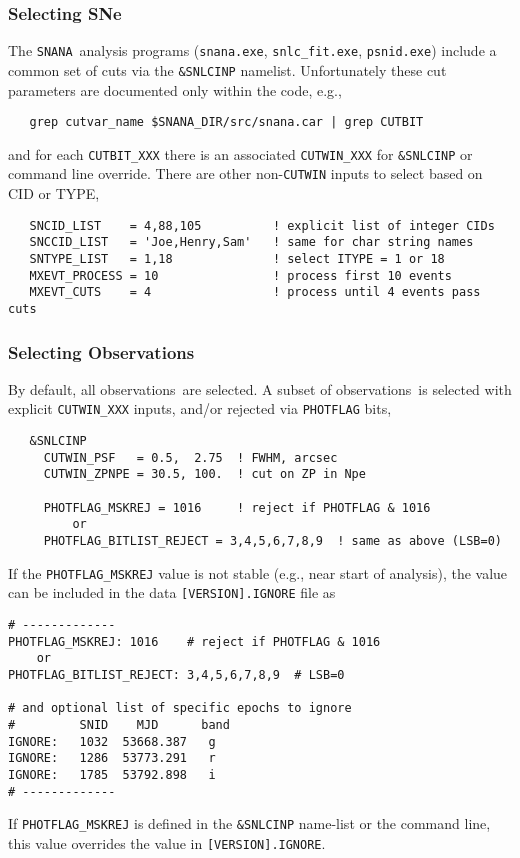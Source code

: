 \documentclass[12pt]{article}
\newcommand{\snana}{{\tt SNANA}}
\newcommand{\obss}{observations}
\begin{document}
  \clearpage
  \subsubsection{Selecting SNe}
  \label{sss:select_SN}

The \snana\ analysis programs 
({\tt snana.exe}, {\tt snlc\_fit.exe}, {\tt psnid.exe})
include a common set of cuts via the {\tt \&SNLCINP} namelist.
Unfortunately these cut parameters are documented only within
the code, e.g.,
\begin{verbatim}                                                               
   grep cutvar_name $SNANA_DIR/src/snana.car | grep CUTBIT
\end{verbatim}
and for each {\tt CUTBIT\_XXX} there is an associated 
{\tt CUTWIN\_XXX} for {\tt \&SNLCINP} or command line override.
There are other non-{\tt CUTWIN} inputs to select based on CID or TYPE,
\begin{verbatim}
   SNCID_LIST    = 4,88,105          ! explicit list of integer CIDs
   SNCCID_LIST   = 'Joe,Henry,Sam'   ! same for char string names
   SNTYPE_LIST   = 1,18              ! select ITYPE = 1 or 18
   MXEVT_PROCESS = 10                ! process first 10 events
   MXEVT_CUTS    = 4                 ! process until 4 events pass cuts
\end{verbatim}


  \subsubsection{Selecting Observations}
  \label{sss:select_obs}

By default, all \obss\ are selected.
A subset of \obss\ is selected with explicit {\tt CUTWIN\_XXX} inputs,
and/or rejected via {\tt PHOTFLAG} bits,
\begin{verbatim} 
   &SNLCINP
     CUTWIN_PSF   = 0.5,  2.75  ! FWHM, arcsec
     CUTWIN_ZPNPE = 30.5, 100.  ! cut on ZP in Npe

     PHOTFLAG_MSKREJ = 1016     ! reject if PHOTFLAG & 1016
         or
     PHOTFLAG_BITLIST_REJECT = 3,4,5,6,7,8,9  ! same as above (LSB=0)
\end{verbatim}
%
If the {\tt PHOTFLAG\_MSKREJ} value is not stable 
(e.g., near start of analysis), the value can be included
in the data {\tt [VERSION].IGNORE} file as
%
\begin{verbatim}
# -------------
PHOTFLAG_MSKREJ: 1016    # reject if PHOTFLAG & 1016
    or
PHOTFLAG_BITLIST_REJECT: 3,4,5,6,7,8,9  # LSB=0

# and optional list of specific epochs to ignore
#         SNID    MJD      band
IGNORE:   1032  53668.387   g 
IGNORE:   1286  53773.291   r
IGNORE:   1785  53792.898   i
# -------------
\end{verbatim}
%
If {\tt PHOTFLAG\_MSKREJ} is defined in the {\tt \&SNLCINP} name-list
or the command line, this value overrides the value in {\tt [VERSION].IGNORE}.
\end{document}
